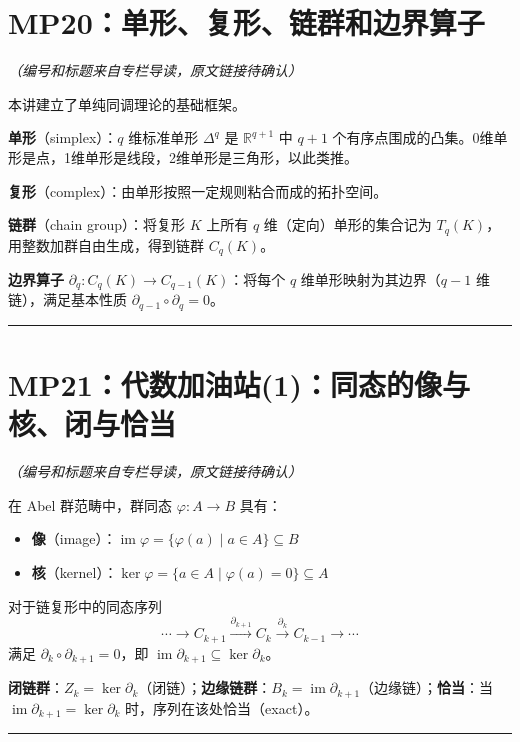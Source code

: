 \documentclass[10pt, openany]{book}
\begin{document}
\section{MP20：单形、复形、链群和边界算子}
\label{sec:mp20}

\textit{（编号和标题来自专栏导读，原文链接待确认）}

本讲建立了单纯同调理论的基础框架。

\textbf{单形}（simplex）：$q$ 维标准单形 $\Delta^q$ 是 $\mathbb{R}^{q+1}$ 中 $q+1$ 个有序点围成的凸集。0维单形是点，1维单形是线段，2维单形是三角形，以此类推。

\textbf{复形}（complex）：由单形按照一定规则粘合而成的拓扑空间。

\textbf{链群}（chain group）：将复形 $K$ 上所有 $q$ 维（定向）单形的集合记为 $T_q(K)$，用整数加群自由生成，得到链群 $C_q(K)$。

\textbf{边界算子} $\partial_q: C_q(K) \to C_{q-1}(K)$：将每个 $q$ 维单形映射为其边界（$q-1$ 维链），满足基本性质 $\partial_{q-1} \circ \partial_q = 0$。

\medskip
\noindent\rule{\textwidth}{0.4pt}

\section{MP21：代数加油站(1)：同态的像与核、闭与恰当}
\label{sec:mp21}

\textit{（编号和标题来自专栏导读，原文链接待确认）}

在 Abel 群范畴中，群同态 $\varphi: A \to B$ 具有：
\begin{itemize}
    \item \textbf{像}（image）：$\operatorname{im} \varphi = \{\varphi(a) \mid a \in A\} \subseteq B$
    \item \textbf{核}（kernel）：$\ker \varphi = \{a \in A \mid \varphi(a) = 0\} \subseteq A$
\end{itemize}

对于链复形中的同态序列
\[
\cdots \to C_{k+1} \xrightarrow{\partial_{k+1}} C_k \xrightarrow{\partial_k} C_{k-1} \to \cdots
\]
满足 $\partial_k \circ \partial_{k+1} = 0$，即 $\operatorname{im} \partial_{k+1} \subseteq \ker \partial_k$。

\textbf{闭链群}：$Z_k = \ker \partial_k$（闭链）；\textbf{边缘链群}：$B_k = \operatorname{im} \partial_{k+1}$（边缘链）；\textbf{恰当}：当 $\operatorname{im} \partial_{k+1} = \ker \partial_k$ 时，序列在该处恰当（exact）。

\medskip
\noindent\rule{\textwidth}{0.4pt}
\end{document}
